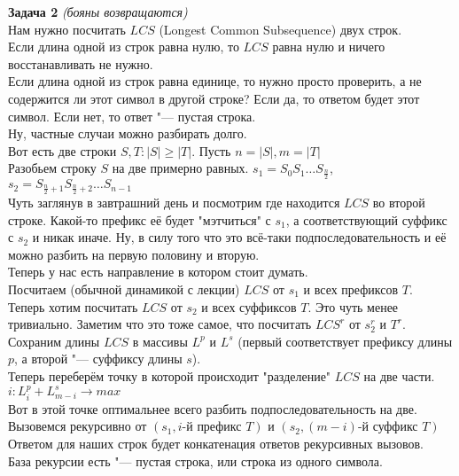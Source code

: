 \documentclass[14pt,a4paper,report]{ncc}
\begin{document}
\textbf{Задача 2} \textit{(бояны возвращаются)}\\

Нам нужно посчитать $LCS$ (Longest Common Subsequence) двух строк.\\
Если длина одной из строк равна нулю, то $LCS$ равна нулю и ничего восстанавливать не нужно.\\
Если длина одной из строк равна единице, то нужно просто проверить, а не содержится ли этот символ в другой строке? Если да, то ответом будет этот символ. Если нет, то ответ "--- пустая строка.\\
Ну, частные случаи можно разбирать долго.\\

Вот есть две строки $S, T: |S| \geq |T|$. Пусть $n = |S|, m = |T|$\\
Разобьем строку $S$ на две примерно равных.
$s_1 = S_0 S_1 \ldots S_{\frac{n}{2}}$, $s_2 = S_{\frac{n}{2}+1} S_{\frac{n}{2}+2} \ldots S_{n-1}$\\

Чуть заглянув в завтрашний день и посмотрим где находится $LCS$ во второй строке. Какой-то префикс её будет "мэтчиться" с $s_1$, а соответствующий суффикс с $s_2$ и никак иначе. Ну, в силу того что это всё-таки подпоследовательность и её можно разбить на первую половину и вторую.\\

Теперь у нас есть направление в котором стоит думать.\\ Посчитаем (обычной динамикой с лекции) $LCS$ от $s_1$ и всех префиксов $T$.\\
Теперь хотим посчитать $LCS$ от $s_2$ и всех суффиксов $T$. Это чуть менее тривиально. Заметим что это тоже самое, что посчитать $LCS^r$ от $s_2^r$ и $T^r$. Сохраним длины $LCS$ в массивы $L^p$ и $L^s$ (первый соответствует префиксу длины $p$, а второй "--- суффиксу длины $s$).\\
Теперь переберём точку в которой происходит "разделение" $LCS$ на две части.\\
$i: L^p_{i} + L^s_{m - i} \rightarrow max$\\
Вот в этой точке оптимальнее всего разбить подпоследовательность на две.\\
Вызовемся рекурсивно от $(s_1, \text{$i$-й префикс $T$})$ и $(s_2, \text{$(m - i)$-й суффикс $T$})$\\
Ответом для наших строк будет конкатенация ответов рекурсивных вызовов.\\
База рекурсии есть "--- пустая строка, или строка из одного символа.\\
\end{document}

